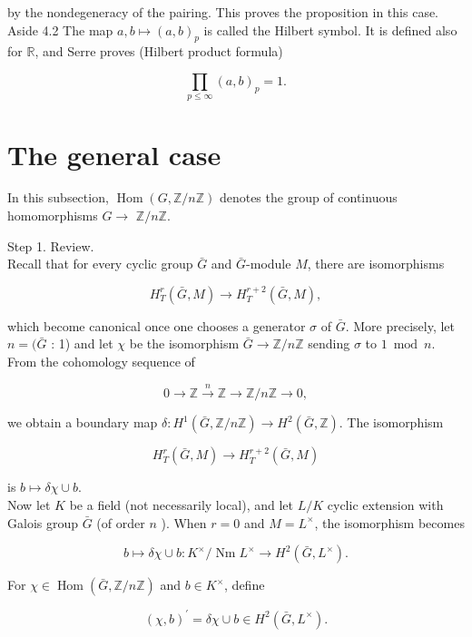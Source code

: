 \documentclass[10pt]{article}
\begin{document}
by the nondegeneracy of the pairing. This proves the proposition in this case.\\
Aside 4.2 The map $a, b \mapsto(a, b)_{p}$ is called the Hilbert symbol. It is defined also for $\mathbb{R}$, and Serre proves (Hilbert product formula)


\begin{equation*}
\prod_{p \leq \infty}(a, b)_{p}=1 . \tag{34}
\end{equation*}


\section*{The general case}
In this subsection, $\operatorname{Hom}(G, \mathbb{Z} / n \mathbb{Z})$ denotes the group of continuous homomorphisms $G \rightarrow$ $\mathbb{Z} / n \mathbb{Z}$.

Step 1. Review.\\
Recall that for every cyclic group $\bar{G}$ and $\bar{G}$-module $M$, there are isomorphisms

$$
H_{T}^{r}(\bar{G}, M) \rightarrow H_{T}^{r+2}(\bar{G}, M),
$$

which become canonical once one chooses a generator $\sigma$ of $\bar{G}$. More precisely, let $n=(\bar{G}$ : 1) and let $\chi$ be the isomorphism $\bar{G} \rightarrow \mathbb{Z} / n \mathbb{Z}$ sending $\sigma$ to $1 \bmod n$. From the cohomology sequence of

$$
0 \rightarrow \mathbb{Z} \xrightarrow{n} \mathbb{Z} \rightarrow \mathbb{Z} / n \mathbb{Z} \rightarrow 0,
$$

we obtain a boundary map $\delta: H^{1}(\bar{G}, \mathbb{Z} / n \mathbb{Z}) \rightarrow H^{2}(\bar{G}, \mathbb{Z})$. The isomorphism

$$
H_{T}^{r}(\bar{G}, M) \rightarrow H_{T}^{r+2}(\bar{G}, M)
$$

is $b \mapsto \delta \chi \cup b$.\\
Now let $K$ be a field (not necessarily local), and let $L / K$ cyclic extension with Galois group $\bar{G}$ (of order $n$ ). When $r=0$ and $M=L^{\times}$, the isomorphism becomes

$$
b \mapsto \delta \chi \cup b: K^{\times} / \operatorname{Nm} L^{\times} \rightarrow H^{2}\left(\bar{G}, L^{\times}\right) .
$$

For $\chi \in \operatorname{Hom}(\bar{G}, \mathbb{Z} / n \mathbb{Z})$ and $b \in K^{\times}$, define

$$
(\chi, b)^{\prime}=\delta \chi \cup b \in H^{2}\left(\bar{G}, L^{\times}\right) .
$$
\end{document}

